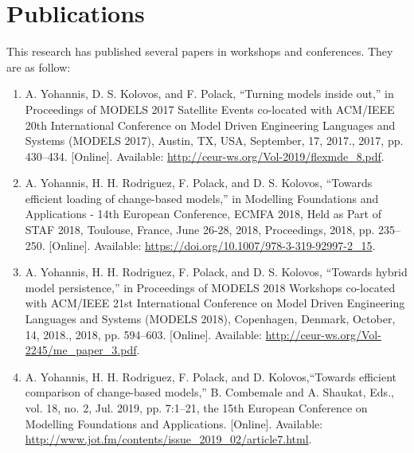 \section{Publications}
\label{sec:publications}
This research has published several papers in workshops and conferences. They are as follow:
\begin{enumerate}
  \item A. Yohannis, D. S. Kolovos, and F. Polack, ``Turning models inside out,'' in Proceedings of MODELS 2017 Satellite Events co-located with ACM/IEEE 20th International Conference on Model Driven Engineering Languages and Systems (MODELS 2017), Austin, TX, USA, September, 17, 2017., 2017, pp. 430–434. [Online]. Available: \url{http://ceur-ws.org/Vol-2019/flexmde_8.pdf}.
  \item  A. Yohannis, H. H. Rodriguez, F. Polack, and D. S. Kolovos, ``Towards efficient loading of change-based models,'' in Modelling Foundations and Applications - 14th European Conference, ECMFA 2018, Held as Part of STAF 2018, Toulouse,  France, June 26-28, 2018, Proceedings, 2018, pp. 235–250. [Online]. Available: \url{https://doi.org/10.1007/978-3-319-92997-2_15}.
  \item  A. Yohannis, H. H. Rodriguez, F. Polack, and D. S. Kolovos, ``Towards hybrid model persistence,'' in Proceedings of MODELS 2018 Workshops co-located with ACM/IEEE 21st International Conference on Model Driven Engineering Languages and Systems (MODELS 2018), Copenhagen, 
  Denmark, October, 14, 2018., 2018, pp. 594–603. [Online]. Available:  \url{http://ceur-ws.org/Vol-2245/me_paper_3.pdf}.
  \item  A. Yohannis, H. H. Rodriguez, F. Polack, and D. Kolovos,``Towards efficient comparison of change-based models,'' B. Combemale and A. Shaukat, Eds., vol. 18, no. 2, Jul. 2019, pp. 7:1–21, the 15th European Conference on Modelling Foundations and Applications. [Online]. Available: 
  \url{http://www.jot.fm/contents/issue_2019_02/article7.html}.
\end{enumerate}
